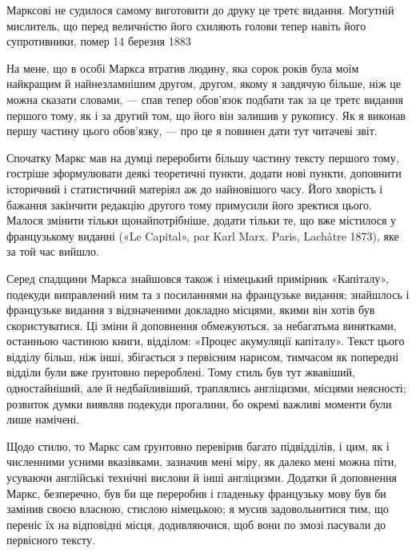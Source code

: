 
Марксові не судилося самому виготовити до друку це третє
видання. Могутній мислитель, що перед величністю його схиляють
голови тепер навіть його супротивники, помер 14 березня 1883~

На мене, що в особі Маркса втратив людину, яка сорок років
була моїм найкращим й найнезламнішим другом, другом, якому
я завдячую більше, ніж це можна сказати словами, — спав
тепер обов’язок подбати так за це третє видання першого тому,
як і за другий том, що його він залишив у рукопису. Як я виконав
першу частину цього обов’язку, — про це я повинен дати тут
читачеві звіт.

Спочатку Маркс мав на думці переробити більшу частину
тексту першого тому, гостріше зформулювати деякі теоретичні
пункти, додати нові пункти, доповнити історичний і статистичний
матеріял аж до найновішого часу. Його хворість і бажання
закінчити редакцію другого тому примусили його зректися цього.
Малося змінити тільки щонайпотрібніше, додати тільки те, що
вже містилося у французькому виданні («Le Capital», par Karl
Marx. Paris, Lachâtre 1873), яке за той час вийшло.

Серед спадщини Маркса знайшовся також і німецький примірник
«Капіталу», подекуди виправлений ним та з посиланнями
на французьке видання; знайшлось і французьке видання з
відзначеними докладно місцями, якими він хотів був скористуватися.
Ці зміни й доповнення обмежуються, за небагатьма винятками,
останньою частиною книги, відділом: «Процес акумуляції
капіталу». Текст цього відділу більш, ніж інші, збігається з первісним
нарисом, тимчасом як попередні відділи були вже ґрунтовно
перероблені. Тому стиль був тут жвавіший, одностайніший,
але й недбайливіший, траплялись англіцизми, місцями неясності;
розвиток думки виявляв подекуди прогалини, бо окремі важливі
моменти були лише намічені.

Щодо стилю, то Маркс сам ґрунтовно перевірив багато підвідділів,
і цим, як і численними усними вказівками, зазначив мені
міру, як далеко мені можна піти, усуваючи англійські технічні
вислови й інші англіцизми. Додатки й доповнення Маркс, безперечно,
був би ще переробив і гладеньку французьку мову був би
замінив своєю власною, стислою німецькою; я мусив задовольнитися
тим, що переніс їх на відповідні місця, додивляючися, щоб
вони по змозі пасували до первісного тексту.

